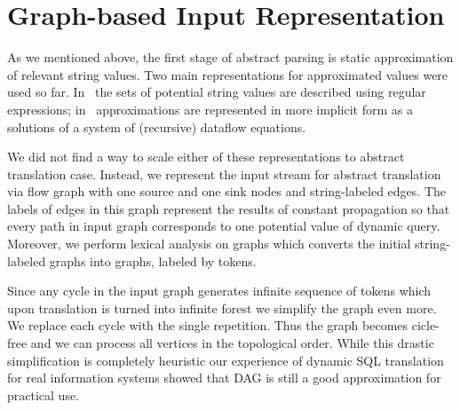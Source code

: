 \section{Graph-based Input Representation}

As we mentioned above, the first stage of abstract parsing is static approximation
of relevant string values. Two main representations for approximated values were
used so far. In~\cite{StringExpr,ALVOR1,ALVOR2} the sets of potential string values 
are described using regular expressions; in~\cite{AbstrParsing} approximations are
represented in more implicit form as a solutions of a system of (recursive) dataflow 
equations. 

We did not find a way to scale either of these representations to abstract translation case. 
Instead, we represent the input stream for abstract translation via flow graph with one source and
one sink nodes and string-labeled edges. The labels of edges in this graph represent the results 
of constant propagation so that every path in input graph corresponds to one potential value of dynamic query. 
Moreover, we perform lexical analysis on graphs which converts the initial string-labeled graphs into
graphs, labeled by tokens.


Since any cycle in the input graph generates infinite sequence of tokens which upon translation is turned 
into infinite forest we simplify the graph even more. We replace each cycle with the single repetition. 
Thus the graph becomes cicle-free and we can process all vertices in the topological order.
While this drastic simplification is completely heuristic our experience of dynamic SQL translation 
for real information systems showed that DAG is still a good approximation for practical use.

